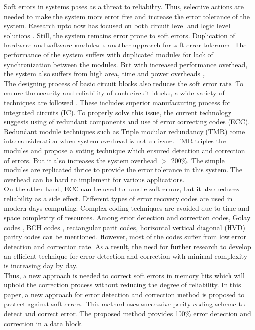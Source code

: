 \documentclass[12pt,a4paper]{report}
\begin{document}
Soft errors in systems poses as a threat to reliability. Thus, selective actions are needed to make the system more error free and increase the error tolerance of the system. Research upto now has focused on both circuit level and logic level solutions \cite{SadiKhanUnddinJan}. Still, the system remains error prone to soft errors. Duplication of hardware and software modules is another approach for soft error tolerance. The performance of the system suffers with duplicated modules for lack of synchronization between the modules. But with increased performance overhead, the system also suffers from high area, time and power overheads \cite{ArgyridesHRDK},\cite{PACART }. \\

The designing process of basic circuit blocks also reduces the soft error rate. To ensure the security and reliability of such circuit blocks, a wide variety of techniques are followed \cite{Nicolaidis}. These includes superior manufacturing process for integrated circuits (IC). To properly solve this issue, the current technology suggests using of redundant components and use of error correcting codes (ECC). Redundant module techniques such as Triple modular redundancy (TMR) \cite{Dubrova} come into consideration when system overhead is not an issue. TMR triples the modules and propose a voting technique which ensured detection and correction of errors. But it also increases the system overhead $>$ 200\%. The simple modules are replicated thrice to provide the error tolerance in this system. The overhead can be hard to implement for various applications. \\

On the other hand, ECC can be used to handle soft errors, but it also reduces reliability as a side effect. Different types of error recovery codes are used in modern days computing. Complex coding techniques are avoided due to time and space complexity of resources. Among error detection and correction codes, Golay codes \cite{mathworld}, BCH codes \cite{ImranAl-ArsGaydadjiev}, rectangular parit codes, horizontal vertical diagonal (HVD) parity codes can be mentioned. However, most of the codes suffer from low error detection and correction rate. As a result, the need for further research to develop an efficient technique for error detection and correction with minimal complexity is increasing day by day. \\

Thus, a new approach is needed to correct soft errors in memory bits which will uphold the correction process without reducing the degree of reliability. In this paper, a new approach for error detection and correction method is proposed to protect against soft errors. This method uses successive parity coding scheme to detect and correct error. The proposed method provides 100\% error detection and correction in a data block. \\
\end{document}
